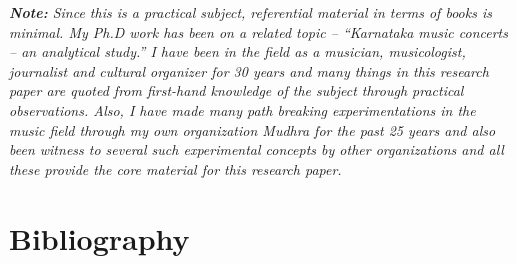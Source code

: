 \textit{\textbf{Note:} Since this is a practical subject, referential material in terms of books is minimal. My Ph.D work has been on a related topic – “Karnataka music concerts – an analytical study.” I have been in the field as a musician, musicologist, journalist and cultural organizer for 30 years and many things in this research paper are quoted from first-hand knowledge of the subject through practical observations. Also, I have made many path breaking experimentations in the music field through my own organization Mudhra for the past 25 years and also been witness to several such experimental concepts by other organizations and all these provide the core material for this research paper.}


\section*{Bibliography}

